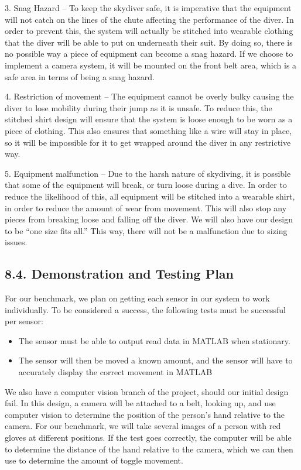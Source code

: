 \documentclass[10pt]{article}
\begin{document}
3. Snag Hazard -- To keep the skydiver safe, it is imperative that the equipment will not catch on the lines of the chute affecting the performance of the diver. In order to prevent this, the system will actually be stitched into wearable clothing that the diver will be able to put on underneath their suit. By doing so, there is no possible way a piece of equipment can become a snag hazard. If we choose to implement a camera system, it will be mounted on the front belt area, which is a safe area in terms of being a snag hazard.

4. Restriction of movement -- The equipment cannot be overly bulky causing the diver to lose mobility during their jump as it is unsafe. To reduce this, the stitched shirt design will ensure that the system is loose enough to be worn as a piece of clothing. This also ensures that something like a wire will stay in place, so it will be impossible for it to get wrapped around the diver in any restrictive way.

5. Equipment malfunction -- Due to the harsh nature of skydiving, it is possible that some of the equipment will break, or turn loose during a dive. In order to reduce the likelihood of this, all equipment will be stitched into a wearable shirt, in order to reduce the amount of wear from movement. This will also stop any pieces from breaking loose and falling off the diver. We will also have our design to be ``one size fits all.'' This way, there will not be a malfunction due to sizing issues.

\subsection{8.4. Demonstration and Testing Plan}
For our benchmark, we plan on getting each sensor in our system to work individually. To be considered a success, the following tests must be successful per sensor:
\begin{itemize}
\item The sensor must be able to output read data in MATLAB when stationary.
\item The sensor will then be moved a known amount, and the sensor will have to accurately display the correct movement in MATLAB
\end{itemize}
We also have a computer vision branch of the project, should our initial design fail. In this design, a camera will be attached to a belt, looking up, and use computer vision to determine the position of the person’s hand relative to the camera. For our benchmark, we will take several images of a person with red gloves at different positions. If the test goes correctly, the computer will be able to determine the distance of the hand relative to the camera, which we can then use to determine the amount of toggle movement.
\end{document}
